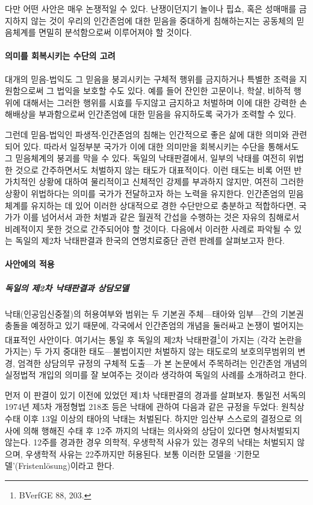 다만 어떤 사안은 매우 논쟁적일 수 있다. 난쟁이던지기 놀이나 핍쇼, 혹은 성매매를 금지하지 않는 것이 우리의 인간존엄에 대한 믿음을 중대하게 침해하는지는 공동체의 믿음체계를 면밀히 분석함으로써 이루어져야 할 것이다.

\paragraph{의미를 회복시키는 수단의 고려}

대개의 믿음-법익도 그 믿음을 붕괴시키는 구체적 행위를 금지하거나 특별한 조력을 지원함으로써 그 법익을 보호할 수도 있다. 예를 들어 잔인한 고문이나, 학살, 비하적 행위에 대해서는 그러한 행위를 시효를 두지않고 금지하고 처벌하며 이에 대한 강력한 손해배상을 부과함으로써 인간존엄에 대한 믿음을 유지하도록 국가가 조력할 수 있다.

그런데 믿음-법익인 파생적-인간존엄의 침해는 인간적으로 좋은 삶에 대한 의미와 관련되어 있다. 따라서 일정부분 국가가 이에 대한 의미만을 회복시키는 수단을 통해서도 그 믿음체계의 붕괴를 막을 수 있다. 독일의 낙태판결에서, 일부의 낙태를 여전히 위법한 것으로 간주하면서도 처벌하지 않는 태도가 대표적이다. 이런 태도는 비록 어떤 반가치적인 상황에 대하여 물리적이고 신체적인 강제를 부과하지 않지만, 여전히 그러한 상황이 위법하다는 의미를 국가가 전달하고자 하는 노력을 유지한다. 인간존엄의 믿음체계를 유지하는 데 있어 이러한 상대적으로 경한 수단만으로 충분하고 적합하다면, 국가가 이를 넘어서서 과한 처벌과 같은 월권적 간섭을 수행하는 것은 자유의 침해로서 비례적이지 못한 것으로 간주되어야 할 것이다. 다음에서 이러한 사례로 파악될 수 있는 독일의 제2차 낙태판결과 한국의 연명치료중단 관련 판례를 살펴보고자 한다.

\paragraph{사안에의 적용}

\subparagraph{독일의 제2차 낙태판결과 상담모델}

낙태(인공임신중절)의 허용여부와 범위는 두 기본권 주체---태아와 임부---간의 기본권 충돌을 예정하고 있기 때문에, 각국에서 인간존엄의 개념을 둘러싸고 논쟁이 벌어지는 대표적인 사안이다. 여기서는 통일 후 독일의 제2차 낙태판결\footnote{BVerfGE 88, 203.}이 가지는 (각각 논란을 가지는) 두 가지 중대한 태도---불법이지만 처벌하지 않는 태도로의 보호의무범위의 변경, 엄격한 상담의무 규정의 구체적 도출---가 본 논문에서 주목하려는 인간존엄 개념의 실정법적 개입의 의미를 잘 보여주는 것이라 생각하여 독일의 사례를 소개하려고 한다.

먼저 이 판결이 있기 이전에 있었던 제1차 낙태판결의 경과를 살펴보자. 통일전 서독의 1974년 제5차 개정형법 218조 등은 낙태에 관하여 다음과 같은 규정을 두었다: 원칙상 수태 이후 13일 이상의 태아의 낙태는 처벌된다. 하지만 임산부 스스로의 결정으로 의사에 의해 행해진 수태 후 12주 까지의 낙태는 의사와의 상담이 있다면 형사처벌되지 않는다. 12주를 경과한 경우 의학적, 우생학적 사유가 있는 경우의 낙태는 처벌되지 않으며, 우생학적 사유는 22주까지만 허용된다. 보통 이러한 모델을 `기한모델'(Fristenlösung)이라고 한다.

